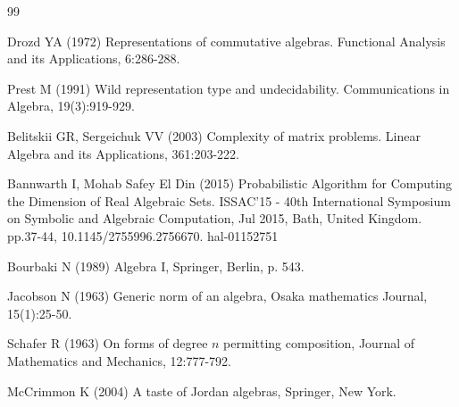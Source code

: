 \documentclass{amsart}
\numberwithin{equation}{section}
\theoremstyle{definition}
\numberwithin{theorem}{section}
\begin{document}
   \begin{thebibliography}{99}
   
     Drozd YA (1972) Representations of commutative algebras. Functional Analysis and its Applications, 6:286-288.
   
        Prest M (1991) Wild representation type and undecidability.  Communications in Algebra, 19(3):919-929.
       
        Belitskii GR, Sergeichuk VV (2003) Complexity of matrix problems.  Linear Algebra and its Applications, 361:203-222.
                      
     Bannwarth I, Mohab Safey El Din (2015) Probabilistic Algorithm for Computing the Dimension of Real Algebraic Sets. ISSAC’15 - 40th International Symposium on Symbolic and Algebraic Computation, Jul 2015, Bath, United Kingdom. pp.37-44, 10.1145/2755996.2756670. hal-01152751
 
   Bourbaki N (1989) Algebra I, Springer, Berlin, p. 543.
  
               Jacobson N  (1963) Generic norm of an algebra, Osaka mathematics Journal, 15(1):25-50.
  
          Schafer R (1963) On forms of degree $n$ permitting composition, Journal of Mathematics and Mechanics, 12:777-792. 
         
      
        McCrimmon K (2004) A taste of Jordan algebras, Springer, New York.
       
      \end{thebibliography}
   
   
\end{document}
